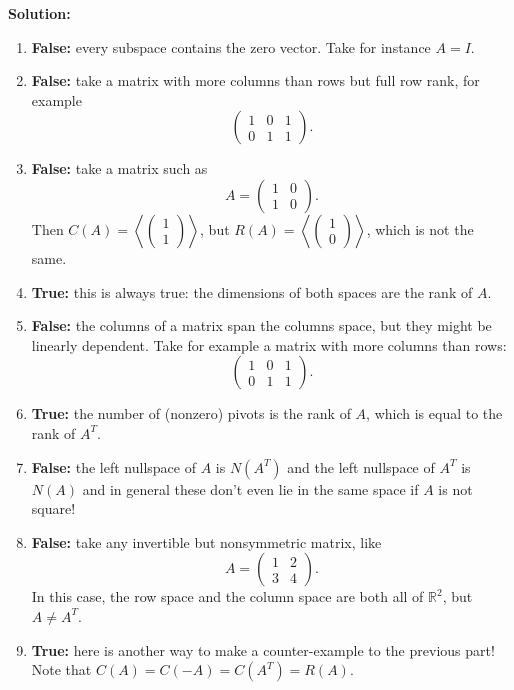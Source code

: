 \documentclass[11pt]{article}
\newcommand{\rr}{\mathbb{R}}
\begin{document}
\begin{enumerate}
\textbf{Solution:}

\begin{enumerate}

\item \textbf{False:} every subspace contains the zero vector.  Take for instance $A = I$.

\item \textbf{False:} take a matrix with more columns than rows but full row rank, for example
\[\begin{pmatrix} 1 & 0 & 1\\ 0 & 1 & 1 \end{pmatrix}. \]

\item \textbf{False:} take a matrix such as
\[A = \begin{pmatrix} 1 & 0 \\ 1 & 0 \end{pmatrix}. \]
Then $C(A) = \left\langle \begin{pmatrix}1 \\ 1 \end{pmatrix} \right\rangle$, but $R(A) =  \left\langle \begin{pmatrix}1 \\ 0 \end{pmatrix} \right\rangle$, which is not the same.

\item \textbf{True:} this is always true: the dimensions of both spaces are the rank of $A$.

\item \textbf{False:} the columns of a matrix span the columns space, but they might be linearly dependent.  Take for example a matrix with more columns than rows:
\[\begin{pmatrix} 1 & 0 & 1\\ 0 & 1 & 1 \end{pmatrix}. \]

\item \textbf{True:} the number of (nonzero) pivots is the rank of $A$, which is equal to the rank of $A^T$.

\item \textbf{False:} the left nullspace of $A $ is $N(A^T)$ and the left nullspace of $A^T$ is $N(A)$ and in general these don't even lie in the same space if $A$ is not square!

\item \textbf{False:} take any invertible but nonsymmetric matrix, like
\[A = \begin{pmatrix} 1 & 2 \\ 3 & 4 \end{pmatrix}. \]
In this case, the row space and the column space are both all of $\rr^2$, but $A \neq A^T$.

\item \textbf{True:} here is another way to make a counter-example to the previous part!  Note that $C(A) = C(-A) = C(A^T) = R(A)$.

\end{enumerate}



\end{enumerate}
\end{document}
